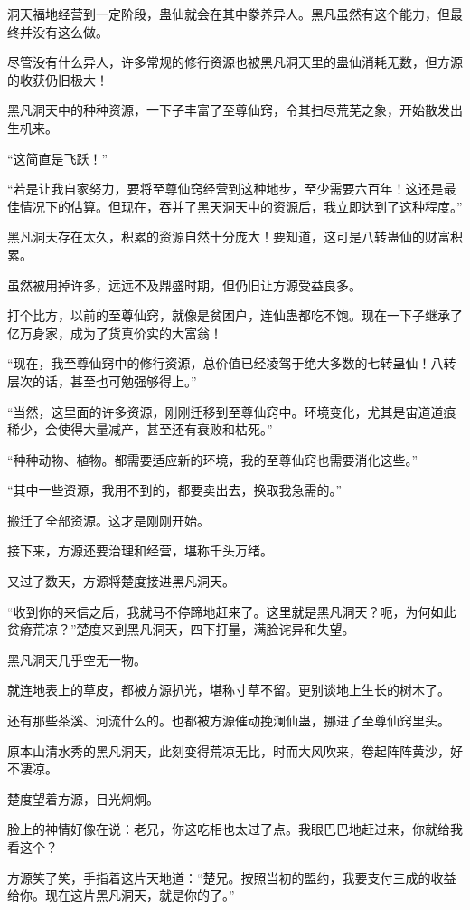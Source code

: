 \begin{this_body}
洞天福地经营到一定阶段，蛊仙就会在其中豢养异人。黑凡虽然有这个能力，但最终并没有这么做。

尽管没有什么异人，许多常规的修行资源也被黑凡洞天里的蛊仙消耗无数，但方源的收获仍旧极大！

黑凡洞天中的种种资源，一下子丰富了至尊仙窍，令其扫尽荒芜之象，开始散发出生机来。

“这简直是飞跃！”

“若是让我自家努力，要将至尊仙窍经营到这种地步，至少需要六百年！这还是最佳情况下的估算。但现在，吞并了黑天洞天中的资源后，我立即达到了这种程度。”

黑凡洞天存在太久，积累的资源自然十分庞大！要知道，这可是八转蛊仙的财富积累。

虽然被用掉许多，远远不及鼎盛时期，但仍旧让方源受益良多。

打个比方，以前的至尊仙窍，就像是贫困户，连仙蛊都吃不饱。现在一下子继承了亿万身家，成为了货真价实的大富翁！

“现在，我至尊仙窍中的修行资源，总价值已经凌驾于绝大多数的七转蛊仙！八转层次的话，甚至也可勉强够得上。”

“当然，这里面的许多资源，刚刚迁移到至尊仙窍中。环境变化，尤其是宙道道痕稀少，会使得大量减产，甚至还有衰败和枯死。”

“种种动物、植物。都需要适应新的环境，我的至尊仙窍也需要消化这些。”

“其中一些资源，我用不到的，都要卖出去，换取我急需的。”

搬迁了全部资源。这才是刚刚开始。

接下来，方源还要治理和经营，堪称千头万绪。

又过了数天，方源将楚度接进黑凡洞天。

“收到你的来信之后，我就马不停蹄地赶来了。这里就是黑凡洞天？呃，为何如此贫瘠荒凉？”楚度来到黑凡洞天，四下打量，满脸诧异和失望。

黑凡洞天几乎空无一物。

就连地表上的草皮，都被方源扒光，堪称寸草不留。更别谈地上生长的树木了。

还有那些茶溪、河流什么的。也都被方源催动挽澜仙蛊，挪进了至尊仙窍里头。

原本山清水秀的黑凡洞天，此刻变得荒凉无比，时而大风吹来，卷起阵阵黄沙，好不凄凉。

楚度望着方源，目光炯炯。

脸上的神情好像在说：老兄，你这吃相也太过了点。我眼巴巴地赶过来，你就给我看这个？

方源笑了笑，手指着这片天地道：“楚兄。按照当初的盟约，我要支付三成的收益给你。现在这片黑凡洞天，就是你的了。”


\end{this_body}
